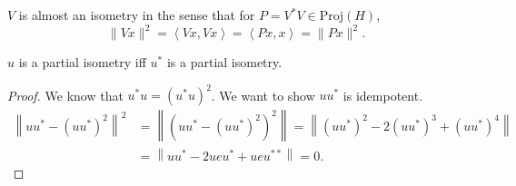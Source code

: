 $V$ is almost an isometry in the sense that for $P = V^* V \in \text{Proj}(H)$,
\[
	\|V x\|^2 = \left\langle V x, V x \right\rangle 
	= \left\langle P x, x \right\rangle 
	= \|P x\|^2
.\] 

\begin{lemma}
	\label{lem:PartialIsometry}
	$u$ is a partial isometry iff $u^*$ is a partial isometry.
\end{lemma}
\begin{proof}
	We know that $u^* u = (u^* u)^2$.
	We want to show $u u^*$ is idempotent.
\[
\begin{aligned}
\left\|u u^*-\left(u u^*\right)^2\right\|^2 & =\left\|\left(u u^*-\left(u u^*\right)^2\right)^2\right\|=\left\|\left(u u^*\right)^2-2\left(u u^*\right)^3+\left(u u^*\right)^4\right\| \\
& =\left\|u u^*-2 u e u^*+u e u^{* *}\right\|=0.
\end{aligned}
\]
\end{proof}




